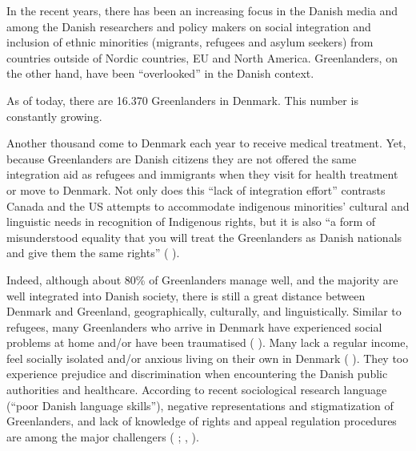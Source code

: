\documentclass[twocolumn, serif, rga, authordate]{jote-article}
\begin{document}
In the recent years, there has been an increasing focus in the Danish media and among the Danish researchers and policy makers on social integration and inclusion of ethnic minorities (migrants, refugees and asylum seekers) from countries outside of Nordic countries, EU and North America. Greenlanders, on the other hand, have been ``overlooked'' in the Danish context.

As of today, there are 16.370 Greenlanders in Denmark. This number is constantly growing.

Another thousand come to Denmark each year to receive medical treatment.
Yet, because Greenlanders are Danish citizens they are not offered the same integration aid as refugees and immigrants when they visit for health treatment or move to Denmark. Not only does this ``lack of integration effort'' contrasts Canada and the US attempts to accommodate indigenous minorities' cultural and linguistic needs in recognition of Indigenous rights, but it is also ``a form of misunderstood equality that you will treat the Greenlanders as Danish nationals and give them the same rights'' ( \citeyear{Toft2018}).

Indeed, although about 80\% of Greenlanders manage well, and the majority are well integrated into Danish society, there is still a great distance between Denmark and Greenland, geographically, culturally, and linguistically. Similar to refugees, many Greenlanders who arrive in Denmark have experienced social problems at home and/or have been traumatised ( \citeyear{laage-petersen2015}). Many lack a regular income, feel socially isolated and/or anxious living on their own in Denmark
( \citeyear{Socialministeriet2003}). They too experience prejudice and discrimination when encountering the Danish public authorities and healthcare. According to recent sociological research language (``poor Danish language skills''), negative representations and stigmatization of Greenlanders, and lack of knowledge of rights and appeal regulation procedures are among the major challengers ( \citeyear{laage-petersen2015}; , \citeyear{Togeby2004}).
\end{document}
